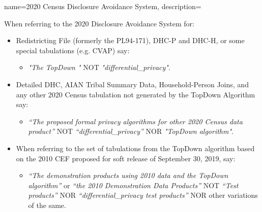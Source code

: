 {
    name=2020 Census Disclosure Avoidance System,
    description={When referring to the 2020 Disclosure Avoidance System for:
    \begin{itemize}
        \item  Redistricting File (formerly the PL94-171), DHC-P and DHC-H, or some special tabulations (e.g. \gls{CVAP}) say:
        \begin{itemize}
            \item \textit{"The \Gls{TopDown} "} NOT \textit{"\Gls{differential_privacy}"}.
        \end{itemize}
        \item Detailed DHC, AIAN Tribal Summary Data, Household-Person Joins, and any other 2020 Census tabulation not generated by the TopDown Algorithm say:
        \begin{itemize}
            \item \textit{``The proposed formal privacy algorithms for other 2020 Census data product''} NOT \textit{``\Gls{differential_privacy}''} NOR \textit{"TopDown algorithm"}.
        \end{itemize}
        \item When referring to the set of tabulations from the TopDown algorithm based on the 2010 CEF proposed for soft release of September 30, 2019, say:
        \begin{itemize}
            \item \textit{``The demonstration products using 2010 data and the TopDown algorithm''} or \textit{``the 2010 Demonstration Data Products''} NOT \textit{``Test products''} NOR \textit{``\Gls{differential_privacy} test products''} NOR other variations of the same.
        \end{itemize}
    \end{itemize}}
}

